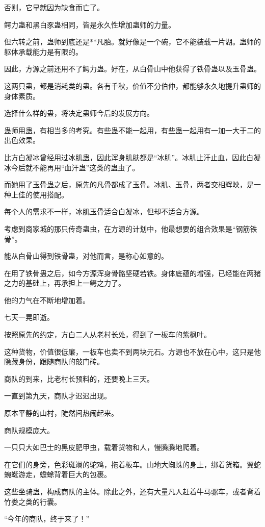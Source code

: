 \begin{this_body}
否则，它早就因为缺食而亡了。

鳄力蛊和黑白豕蛊相同，皆是永久性增加蛊师的力量。

但六转之前，蛊师到底还是**凡胎。就好像是一个碗，它不能装载一片湖。蛊师的躯体承载能力是有限的。

因此，方源之前还用不了鳄力蛊。好在，从白骨山中他获得了铁骨蛊以及玉骨蛊。

这两只蛊，都是消耗类的蛊。各有千秋，价值不分伯仲，都能够永久地提升蛊师的身体素质。

选择什么样的蛊，将决定蛊师今后的发展方向。

蛊师用蛊，有相当多的考究。有些蛊不能一起用，有些蛊一起用有一加一大于二的出色效果。

比方白凝冰曾经用过冰肌蛊，因此浑身肌肤都是“冰肌”。冰肌止汗止血，因此白凝冰今后就不能再用“血汗蛊”这类的蛊虫了。

而她用了玉骨蛊之后，原先的凡骨都成了玉骨。冰肌、玉骨，两者交相辉映，是一种上佳的使用搭配。

每个人的需求不一样，冰肌玉骨适合白凝冰，但却不适合方源。

考虑到商家城的那只传奇蛊虫，在方源的计划中，他最想要的组合效果是“钢筋铁骨”。

能从白骨山得到铁骨蛊，对他而言，是称心如意的。

在用了铁骨蛊之后，如今方源浑身骨骼坚硬若铁。身体底蕴的增强，已经能在两猪之力的基础上，再承担上一鳄之力了。

他的力气在不断地增加着。

七天一晃即逝。

按照原先的约定，方白二人从老村长处，得到了一板车的紫枫叶。

这种货物，价值很低廉，一板车也卖不到两块元石。方源也不放在心中，这只是他隐藏身份，跟随商队的敲门砖。

商队的到来，比老村长预料的，还要晚上三天。

一直到第九天，商队才迟迟出现。

原本平静的山村，陡然间热闹起来。

商队规模庞大。

一只只大如巴士的黑皮肥甲虫，载着货物和人，慢腾腾地爬着。

在它们的身旁，色彩斑斓的驼鸡，拖着板车。山地大蜘蛛的身上，绑着货箱。翼蛇蜿蜒游走，蟾蜍背着巨大的包裹。

这些坐骑蛊，构成商队的主体。除此之外，还有大量凡人赶着牛马骡车，或者背着竹娄之类的行囊。

“今年的商队，终于来了！”


\end{this_body}
